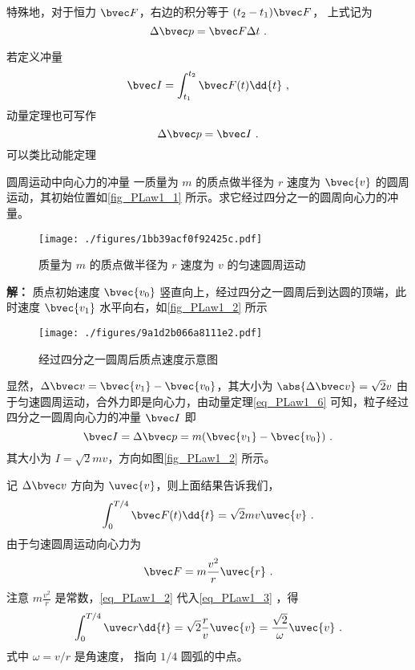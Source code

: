 特殊地，对于恒力 $\bvec F$，右边的积分等于 $(t_2-t_1)\bvec F$， 上式记为
\begin{equation}\label{eq_PLaw1_1}
\Delta \bvec p = \bvec F \Delta t~.
\end{equation}

若定义冲量
\begin{equation}
\bvec I=\int_{t_1}^{t_2}\bvec F(t) \dd{t}~,
\end{equation}
动量定理也可写作
\begin{equation}
\Delta \bvec p = \bvec I~.
\end{equation}
可以类比动能定理

\begin{example}{圆周运动中向心力的冲量}
一质量为 $m$ 的质点做半径为 $r$ 速度为 $\bvec{v}$ 的圆周运动，其初始位置如\autoref{fig_PLaw1_1} 所示。求它经过四分之一的圆周向心力的冲量。
\begin{figure}[ht]
\centering
\texttt{[image: ./figures/1bb39acf0f92425c.pdf]}
\caption{质量为 $m$ 的质点做半径为 $r$ 速度为 $v$ 的匀速圆周运动} \label{fig_PLaw1_1}
\end{figure}
\textbf{解：} 质点初始速度 $\bvec{v_0}$ 竖直向上，经过四分之一圆周后到达圆的顶端，此时速度 $\bvec{v_1}$ 水平向右，如\autoref{fig_PLaw1_2} 所示
\begin{figure}[ht]
\centering
\texttt{[image: ./figures/9a1d2b066a8111e2.pdf]}
\caption{经过四分之一圆周后质点速度示意图} \label{fig_PLaw1_2}
\end{figure}
显然，$\Delta\bvec v=\bvec{v_1}-\bvec{v_0}$，其大小为 $\abs{\Delta\bvec v}=\sqrt{2}v$ 由于匀速圆周运动，合外力即是向心力，由动量定理\autoref{eq_PLaw1_6}  可知，粒子经过四分之一圆周向心力的冲量 $\bvec I$ 即
\begin{equation}
\bvec I=\Delta\bvec p=m(\bvec{v_1}-\bvec{v_0})~.
\end{equation}
其大小为 $I=\sqrt{2}mv$，方向如图\autoref{fig_PLaw1_2} 所示。

记 $\Delta\bvec v$ 方向为 $\uvec{v}$，则上面结果告诉我们，
\begin{equation}\label{eq_PLaw1_3}
\int_{0}^{T/4}\bvec F(t) \dd{t}=\sqrt{2}mv\uvec{v}~.
\end{equation}
由于匀速圆周运动向心力为
\begin{equation}\label{eq_PLaw1_2}
\bvec F=m\frac{v^2}{r}\uvec{r}~.
\end{equation}
注意 $m\frac{v^2}{r}$ 是常数，\autoref{eq_PLaw1_2} 代入\autoref{eq_PLaw1_3} ，得
\begin{equation}\label{eq_PLaw1_5}
\int_{0}^{T/4}\uvec r \dd{t}=\sqrt{2}\frac{r}{v}\uvec{v}=\frac{\sqrt{2}}{\omega}\uvec{v}~.
\end{equation}
式中 $\omega={v}/{r}$ 是角速度， 指向 $1/4$ 圆弧的中点。


\end{example}
